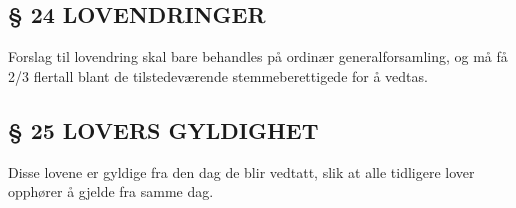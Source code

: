 \subsection*{§ 24 LOVENDRINGER}

Forslag til lovendring skal bare behandles på ordinær
generalforsamling, og må få 2/3 flertall blant de tilstedeværende
stemmeberettigede for å vedtas.


\subsection*{§ 25 LOVERS GYLDIGHET}

Disse lovene er gyldige fra den dag de blir vedtatt, slik at alle
tidligere lover opphører å gjelde fra samme dag.



